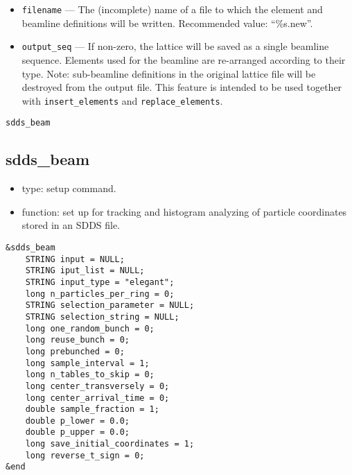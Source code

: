 \documentclass[11pt]{article}
\begin{document}
\begin{itemize}
\item \verb|filename| --- The (incomplete) name of a file to which the element and beamline definitions
will be written.  Recommended value: ``\%s.new''.
\item \verb|output_seq| --- If non-zero, the lattice will be saved as a single beamline sequence.
Elements used for the beamline are re-arranged according to their type. Note: 
sub-beamline definitions in the original lattice file will be destroyed from the output file.
This feature is intended to be used 
together with \verb|insert_elements| and \verb|replace_elements|. 
\end{itemize}

\begin{latexonly}
\newpage
\begin{center}{\Large\verb|sdds_beam|}\end{center}
\end{latexonly}
\subsection{sdds\_beam \label{subsec:sddsbeam}}

\begin{itemize}
\item type: setup command.
\item function: set up for tracking and histogram analyzing of particle coordinates stored in an SDDS file.
\end{itemize}

\begin{verbatim}
&sdds_beam
    STRING input = NULL;
    STRING iput_list = NULL;
    STRING input_type = "elegant";
    long n_particles_per_ring = 0;
    STRING selection_parameter = NULL;
    STRING selection_string = NULL;
    long one_random_bunch = 0;
    long reuse_bunch = 0;
    long prebunched = 0;
    long sample_interval = 1;
    long n_tables_to_skip = 0;
    long center_transversely = 0;
    long center_arrival_time = 0;
    double sample_fraction = 1;
    double p_lower = 0.0;
    double p_upper = 0.0;
    long save_initial_coordinates = 1;
    long reverse_t_sign = 0;
&end
\end{verbatim}
\end{document}

